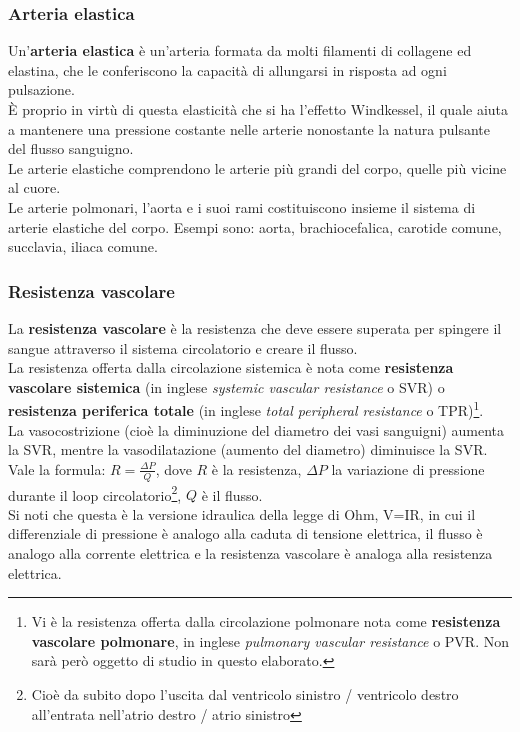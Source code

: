 \subsubsection{Arteria elastica}
Un'\textbf{arteria elastica} è un'arteria formata da molti filamenti di collagene ed elastina, che le conferiscono la capacità di allungarsi in risposta ad ogni pulsazione. 
\\
È proprio in virtù di questa elasticità che si ha l'effetto Windkessel, il quale aiuta a mantenere una pressione costante nelle arterie nonostante la natura pulsante del flusso sanguigno. 
\\
Le arterie elastiche comprendono le arterie più grandi del corpo, quelle più vicine al cuore.
\\
Le arterie polmonari, l'aorta e i suoi rami costituiscono insieme il sistema di arterie elastiche del corpo. Esempi sono: aorta, brachiocefalica, carotide comune, succlavia, iliaca comune.


\subsubsection{Resistenza vascolare}
La \textbf{resistenza vascolare} è la resistenza che deve essere superata per spingere il sangue attraverso il sistema circolatorio e creare il flusso. 
\\
La resistenza offerta dalla circolazione sistemica è nota come \textbf{resistenza vascolare sistemica} (in inglese \textit{systemic vascular resistance} o SVR) o \textbf{resistenza periferica totale} (in inglese \textit{total peripheral resistance} o TPR)\footnote{Vi è la resistenza offerta dalla circolazione polmonare nota come \textbf{resistenza vascolare polmonare}, in inglese \textit{pulmonary vascular resistance} o PVR. Non sarà però oggetto di studio in questo elaborato.}.
\\La vasocostrizione (cioè la diminuzione del diametro dei vasi sanguigni) aumenta la SVR, mentre la vasodilatazione (aumento del diametro) diminuisce la SVR.
\\
Vale la formula: $R=\frac{\Delta P}{Q}$, dove $R$ è la resistenza, $\Delta P$ la variazione di pressione durante il loop circolatorio\footnote{Cioè da subito dopo l'uscita dal ventricolo sinistro / ventricolo destro all'entrata nell'atrio destro / atrio sinistro}, $Q$ è il flusso.\\
Si noti che questa è la versione idraulica della legge di Ohm, V=IR, in cui il differenziale di pressione è analogo alla caduta di tensione elettrica, il flusso è analogo alla corrente elettrica e la resistenza vascolare è analoga alla resistenza elettrica.


